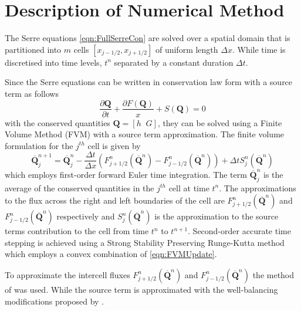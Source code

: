 \documentclass[times]{elsarticle}
\newcommand{\vecn}[1]{\boldsymbol{#1}}
\begin{document}
\section{Description of Numerical Method}
The Serre equations \eqref{eqn:FullSerreCon} are solved over a spatial domain that is partitioned into $m$ cells $\left[x_{j-1/2},x_{j+1/2}\right]$ of uniform length $\Delta x$. While time is discretised into time levels, $t^n$ separated by a constant duration $\Delta t$.

Since the Serre equations can be written in conservation law form with a source term as follows
\begin{equation*}
\frac{\partial \vecn{Q} }{\partial t} + \frac{\partial F(\vecn{Q} )}{x} + S(\vecn{Q} ) = 0
\end{equation*}
with the conserved quantities $\vecn{Q}  = \left[h \; \; G\right]$, they can be solved using a Finite Volume Method (FVM) with a source term approximation. The finite volume formulation for the $j^{th}$ cell is given by
\begin{equation}
\label{eqn:FVMUpdate}
\overline{\vecn{Q} }^{n+1}_j = \overline{\vecn{Q} }^{n}_j - \frac{\Delta t}{\Delta x} \left(F^n_{j+1/2}\left(\overline{\vecn{Q} }^{n} \right) - F^n_{j-1/2}\left(\overline{\vecn{Q} }^{n} \right) \right) + \Delta t S^n_j\left(\overline{\vecn{Q} }^{n} \right)
\end{equation}
which employs first-order forward Euler time integration. The term $\overline{\vecn{Q} }^{n}_j $ is the average of the conserved quantities in the $j^{th}$ cell at time $t^n$. The approximations to the flux across the right and left boundaries of the cell are $F^n_{j+1/2}\left(\overline{\vecn{Q} }^{n} \right)$ and $ F^n_{j-1/2}\left(\overline{\vecn{Q} }^{n} \right)$ respectively and $S^n_j\left(\overline{\vecn{Q} }^{n} \right)$ is the approximation to the source terms contribution to the cell from time $t^n$ to $t^{n+1}$. Second-order accurate time stepping is achieved using a Strong Stability Preserving Runge-Kutta method \cite{Gottlieb-etal-2003-89} which employs a convex combination of \eqref{eqn:FVMUpdate}.

To approximate the intercell fluxes $F^n_{j+1/2}\left(\overline{\vecn{Q} }^{n} \right)$ and $F^n_{j-1/2}\left(\overline{\vecn{Q} }^{n} \right)$ the method of \citet{Kurganov-etal-2001-707} was used. While the source term is approximated with the well-balancing modifications proposed by \citet{Klein-etal-2004-2050}.
\end{document}
